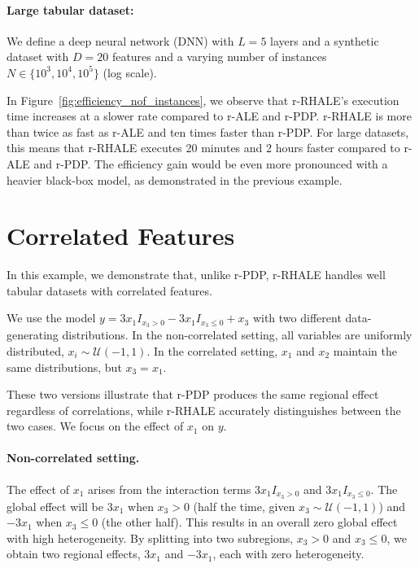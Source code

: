 \documentclass[
twocolumn,
]{ceurart}
\begin{document}
\paragraph{Large tabular dataset:}

We define a deep neural network (DNN) with \( L = 5 \) layers and a synthetic dataset with \( D = 20 \) features and a varying number of instances \( N \in \{10^3, 10^4, 10^5\} \) (log scale).

In Figure~\ref{fig:efficiency_nof_instances}, we observe that r-RHALE's execution time increases at a slower rate compared to r-ALE and r-PDP. r-RHALE is more than twice as fast as r-ALE and ten times faster than r-PDP. For large datasets, this means that r-RHALE executes 20 minutes and 2 hours faster compared to r-ALE and  r-PDP. The efficiency gain would be even more pronounced with a heavier black-box model, as demonstrated in the previous example.


\section{Correlated Features}
\label{sec:correlated-features}

In this example, we demonstrate that, unlike r-PDP, r-RHALE handles well tabular datasets with correlated features.

We use the model \( y = 3x_1I_{x_3 > 0} - 3x_1I_{x_3 \leq 0} + x_3 \) with two different data-generating distributions. In the non-correlated setting, all variables are uniformly distributed, \( x_i \sim \mathcal{U}(-1,1) \). In the correlated setting, \( x_1 \) and \( x_2 \) maintain the same distributions, but \( x_3 = x_1 \).

These two versions illustrate that r-PDP produces the same regional effect regardless of correlations, while r-RHALE accurately distinguishes between the two cases. We focus on the effect of \( x_1 \) on \( y \).

\paragraph{Non-correlated setting.}

The effect of \( x_1 \) arises from the interaction terms \( 3x_1I_{x_3>0} \) and \( 3x_1I_{x_3\leq0} \). The global effect will be \( 3x_1 \) when \( x_3 > 0 \) (half the time, given \( x_3 \sim \mathcal{U}(-1,1) \)) and \( -3x_1 \) when \( x_3 \leq 0 \) (the other half). This results in an overall zero global effect with high heterogeneity. By splitting into two subregions, \( x_3 > 0 \) and \( x_3 \leq 0 \), we obtain two regional effects, \( 3x_1 \) and \( -3x_1 \), each with zero heterogeneity.
\end{document}
